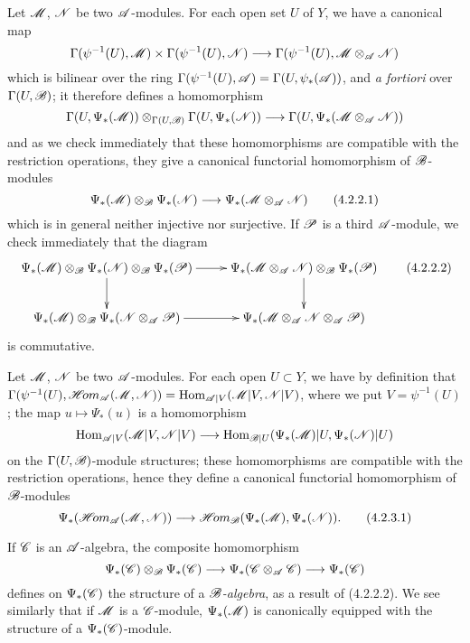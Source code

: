 \begin{env}[4.2.2]
\label{env-0.4.2.2}
Let $\mathscr{M}$, $\mathscr{N}$ be two $\mathscr{A}$-modules. For each open set $U$ of $Y$, we
have a canonical map
\[
  \Gamma(\psi^{-1}(U),\mathscr{M})\times\Gamma(\psi^{-1}(U),\mathscr{N})
  \longrightarrow\Gamma(\psi^{-1}(U),\mathscr{M}\otimes_\mathscr{A}\mathscr{N})
\]
which is bilinear over the ring
$\Gamma(\psi^{-1}(U),\mathscr{A})=\Gamma(U,\psi_*(\mathscr{A}))$, and {\em a fortiori}
over $\Gamma(U,\mathscr{B})$; it therefore defines a homomorphism
\[
  \Gamma(U,\Psi_*(\mathscr{M}))\otimes_{\Gamma(U,\mathscr{B})}\Gamma(U,\Psi_*(\mathscr{N}))
  \longrightarrow\Gamma(U,\Psi_*(\mathscr{M}\otimes_\mathscr{A}\mathscr{N}))
\]
and as we check immediately that these homomorphisms are compatible with the
restriction operations, they give a canonical functorial homomorphism of
$\mathscr{B}$-modules
\[
  \Psi_*(\mathscr{M})\otimes_\mathscr{B}\Psi_*(\mathscr{N})
  \longrightarrow\Psi_*(\mathscr{M}\otimes_\mathscr{A}\mathscr{N})
  \tag{4.2.2.1}
\]
which is in general neither injective nor surjective. If $\mathscr{P}$ is a third
$\mathscr{A}$-module, we check immediately that the diagram
\[
  \xymatrix{
    \Psi_*(\sh{M})\otimes_\sh{B}\Psi_*(\sh{N})\otimes_\sh{B}\Psi_*(\sh{P})\ar[r]\ar[d]
    & \Psi_*(\sh{M}\otimes_\sh{A}\sh{N})\otimes_\sh{B}\Psi_*(\sh{P})\ar[d]\\
    \Psi_*(\sh{M})\otimes_\sh{B}\Psi_*(\sh{N}\otimes_\sh{A}\sh{P})\ar[r]
    & \Psi_*(\sh{M}\otimes_\sh{A}\sh{N}\otimes_\sh{A}\sh{P})
  }
  \tag{4.2.2.2}
\]
is commutative.
\end{env}

\begin{env}[4.2.3]
\label{env-0.4.2.3}
Let $\mathscr{M}$, $\mathscr{N}$ be two $\mathscr{A}$-modules. For each open $U\subset Y$, we
have by definition that
$\Gamma(\psi^{-1}(U),\mathscr{H}\!{om}_\mathscr{A}(\mathscr{M},\mathscr{N}))
  ={\mathop{\mathrm{Hom}}\nolimits}_{\mathscr{A}|V}(\mathscr{M}|V,\mathscr{N}|V)$, where we put $V=\psi^{-1}(U)$; the map
$u\mapsto\Psi_*(u)$ is a homomorphism
\[
  {\mathop{\mathrm{Hom}}\nolimits}_{\mathscr{A}|V}(\mathscr{M}|V,\mathscr{N}|V)
  \longrightarrow{\mathop{\mathrm{Hom}}\nolimits}_{\mathscr{B}|U}(\Psi_*(\mathscr{M})|U,\Psi_*(\mathscr{N})|U)
\]
on the $\Gamma(U,\mathscr{B})$-module structures; these homomorphisms are compatible
with the restriction operations, hence they define a canonical functorial
homomorphism of $\mathscr{B}$-modules
\[
  \Psi_*(\mathscr{H}\!{om}_\mathscr{A}(\mathscr{M},\mathscr{N}))
  \longrightarrow\mathscr{H}\!{om}_\mathscr{B}(\Psi_*(\mathscr{M}),\Psi_*(\mathscr{N})).
  \tag{4.2.3.1}
\]
\end{env}

\begin{env}[4.2.4]
\label{env-0.4.2.4}
If $\mathscr{C}$ is an $\mathscr{A}$-algebra, the composite homomorphism
\[
  \Psi_*(\mathscr{C})\otimes_\mathscr{B}\Psi_*(\mathscr{C})
  \longrightarrow\Psi_*(\mathscr{C}\otimes_\mathscr{A}\mathscr{C})
  \longrightarrow\Psi_*(\mathscr{C})
\]
defines on $\Psi_*(\mathscr{C})$ the structure of a {\em $\mathscr{B}$-algebra}, as a
result of (4.2.2.2). We see similarly that if $\mathscr{M}$ is a $\mathscr{C}$-module,
$\Psi_*(\mathscr{M})$ is canonically equipped with the structure of a
$\Psi_*(\mathscr{C})$-module.
\end{env}

